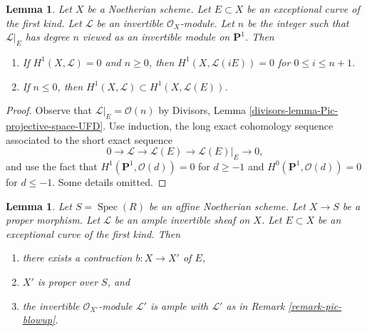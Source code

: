 \documentclass{stacks-project}
\theoremstyle{plain}
\newtheorem{lemma}[subsection]{Lemma}
\theoremstyle{definition}
\theoremstyle{remark}
\numberwithin{equation}{subsection}
\def\Spec{\mathop{\mathrm{Spec}}}
\begin{document}
\begin{lemma}
\label{lemma-lift-sections-and-h1}
Let $X$ be a Noetherian scheme. Let $E \subset X$ be an
exceptional curve of the first kind. Let $\mathcal{L}$ be
an invertible $\mathcal{O}_X$-module.
Let $n$ be the integer such that $\mathcal{L}|_E$ has degree $n$
viewed as an invertible module on $\mathbf{P}^1$. Then
\begin{enumerate}
\item If $H^1(X, \mathcal{L}) = 0$ and $n \geq 0$, then
$H^1(X, \mathcal{L}(iE)) = 0$ for $0 \leq i \leq n + 1$.
\item If $n \leq 0$, then
$H^1(X, \mathcal{L}) \subset H^1(X, \mathcal{L}(E))$.
\end{enumerate}
\end{lemma}

\begin{proof}
Observe that $\mathcal{L}|_E = \mathcal{O}(n)$ by
Divisors, Lemma \ref{divisors-lemma-Pic-projective-space-UFD}.
Use induction, the long exact cohomology sequence associated to the
short exact sequence
$$
0 \to \mathcal{L} \to \mathcal{L}(E) \to \mathcal{L}(E)|_E \to 0,
$$
and use the fact that $H^1(\mathbf{P}^1, \mathcal{O}(d)) = 0$ for
$d \geq -1$ and $H^0(\mathbf{P}^1, \mathcal{O}(d)) = 0$ for
$d \leq -1$. Some details omitted.
\end{proof}

\begin{lemma}
\label{lemma-contract-ample}
Let $S = \Spec(R)$ be an affine Noetherian scheme.
Let $X \to S$ be a proper morphism. Let $\mathcal{L}$ be an
ample invertible sheaf on $X$. Let $E \subset X$ be an
exceptional curve of the first kind. Then
\begin{enumerate}
\item there exists a contraction $b : X \to X'$ of $E$,
\item $X'$ is proper over $S$, and
\item the invertible $\mathcal{O}_{X'}$-module $\mathcal{L}'$
is ample with $\mathcal{L}'$ as in Remark \ref{remark-pic-blowup}.
\end{enumerate}
\end{lemma}
\end{document}

